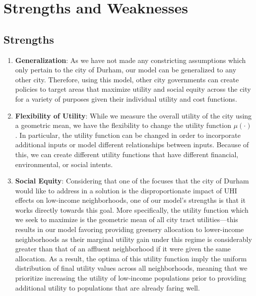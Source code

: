 \documentclass[11pt]{article}
\begin{document}
\section{Strengths and Weaknesses}
\subsection{Strengths}
\begin{enumerate}
\item \textbf{Generalization}: As we have not made any constricting assumptions which only pertain to the city of Durham, our model can be generalized to any other city. Therefore, using this model, other city governments can create policies to target areas that maximize utility and social equity across the city for a variety of purposes given their individual utility and cost functions.

\item \textbf{Flexibility of Utility}: While we measure the overall utility of the city using a geometric mean, we have the flexibility to change the utility function $\mu(\cdot)$. In particular, the utility function can be changed in order to incorporate additional inputs or model different relationships between inputs. Because of this, we can create different utility functions that have different financial, environmental, or social intents.

\item \textbf{Social Equity}: Considering that one of the focuses that the city of Durham would like to address in a solution is the disproportionate impact of UHI effects on low-income neighborhoods, one of our model's strengths is that it works directly towards this goal. More specifically, the utility function which we seek to maximize is the geometric mean of all city tract utilities---this results in our model favoring providing greenery allocation to lower-income neighborhoods as their marginal utility gain under this regime is considerably greater than that of an affluent neighborhood if it were given the same allocation. As a result, the optima of this utility function imply the uniform distribution of final utility values across all neighborhoods, meaning that we prioritize increasing the utility of low-income populations prior to providing additional utility to populations that are already faring well.
\end{enumerate}
\end{document}
